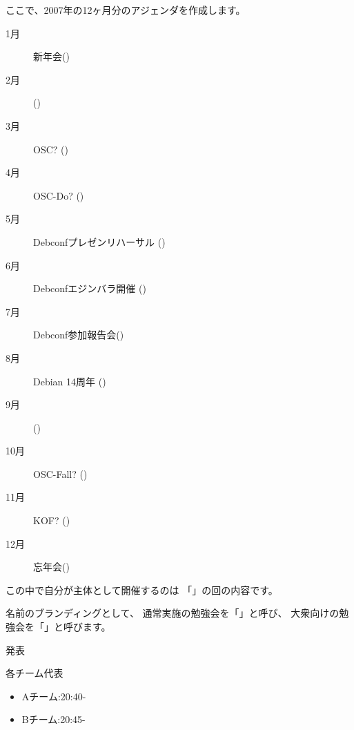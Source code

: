 \documentclass[cjk,dvipdfmx]{beamer}
\begin{document}
\begin{frame}
\tiny
 
ここで、2007年の12ヶ月分のアジェンダを作成します。

\begin{description}
 \item[1月] 新年会(\underline{\hspace{8cm}})
 \item[2月] (\underline{\hspace{8cm}})
 \item[3月] OSC? (\underline{\hspace{8cm}})
 \item[4月] OSC-Do? (\underline{\hspace{8cm}})
 \item[5月] Debconfプレゼンリハーサル (\underline{\hspace{8cm}})
 \item[6月] Debconfエジンバラ開催 (\underline{\hspace{8cm}})
 \item[7月] Debconf参加報告会(\underline{\hspace{8cm}})
 \item[8月] Debian 14周年 (\underline{\hspace{8cm}})
 \item[9月] (\underline{\hspace{8cm}})
 \item[10月] OSC-Fall? (\underline{\hspace{8cm}})
 \item[11月] KOF? (\underline{\hspace{8cm}})
 \item[12月] 忘年会(\underline{\hspace{8cm}})
\end{description}

この中で自分が主体として開催するのは
「\underline{\hspace{8cm}}」の回の内容です。

名前のブランディングとして、
通常実施の勉強会を「\underline{\hspace{8cm}}」と呼び、
大衆向けの勉強会を「\underline{\hspace{8cm}}」と呼びます。


\end{frame}

\begin{frame}{発表}
 
各チーム代表

\begin{itemize}
 \item Aチーム:20:40-
 \item Bチーム:20:45-
\end{itemize}
\end{frame}
\end{document}
